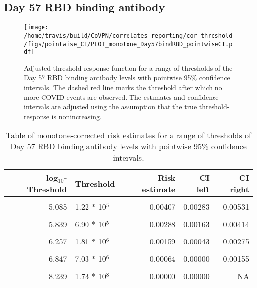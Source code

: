 \documentclass[]{book}
\theoremstyle{definition}
\theoremstyle{definition}
\theoremstyle{definition}
\newcommand{\1}{\mathbbm{1}}
\begin{document}
\newpage

\newpage

\newpage

\hypertarget{day-57-rbd-binding-antibody-1}{%
\subsection{Day 57 RBD binding antibody}\label{day-57-rbd-binding-antibody-1}}

\begin{figure}[H]
\centering
\texttt{[image: /home/travis/build/CoVPN/correlates\_reporting/cor\_threshold/figs/pointwise\_CI/PLOT\_monotone\_Day57bindRBD\_pointwiseCI.pdf]}
\caption{Adjusted threshold-response function for a range of thresholds of the
  Day 57 RBD binding antibody levels with pointwise 95\% confidence intervals. The dashed red line marks the threshold after which no more COVID events are observed. The estimates and confidence intervals are adjusted using the assumption that the true threshold-response is nonincreasing.}
\end{figure}
\begin{table}[!h]

\caption{\label{tab:unnamed-chunk-365}Table of monotone-corrected risk estimates for a range of thresholds of Day 57 RBD binding antibody levels with pointwise 95\% confidence intervals.}
\centering
\begin{tabular}[t]{rlrrr}
\toprule
log$_{10}$-Threshold & Threshold & Risk estimate & CI left & CI right\\
\midrule
\cellcolor{gray!6}{4.062} & \cellcolor{gray!6}{1.15 * 10$^4$} & \cellcolor{gray!6}{0.00490} & \cellcolor{gray!6}{0.00360} & \cellcolor{gray!6}{0.00619}\\
5.085 & 1.22 * 10$^5$ & 0.00407 & 0.00283 & 0.00531\\
\cellcolor{gray!6}{5.507} & \cellcolor{gray!6}{3.21 * 10$^5$} & \cellcolor{gray!6}{0.00377} & \cellcolor{gray!6}{0.00247} & \cellcolor{gray!6}{0.00507}\\
5.839 & 6.90 * 10$^5$ & 0.00288 & 0.00163 & 0.00414\\
\cellcolor{gray!6}{6.048} & \cellcolor{gray!6}{1.12 * 10$^6$} & \cellcolor{gray!6}{0.00238} & \cellcolor{gray!6}{0.00113} & \cellcolor{gray!6}{0.00364}\\
6.257 & 1.81 * 10$^6$ & 0.00159 & 0.00043 & 0.00275\\
\cellcolor{gray!6}{6.499} & \cellcolor{gray!6}{3.16 * 10$^6$} & \cellcolor{gray!6}{0.00124} & \cellcolor{gray!6}{0.00001} & \cellcolor{gray!6}{0.00248}\\
6.847 & 7.03 * 10$^6$ & 0.00064 & 0.00000 & 0.00155\\
\cellcolor{gray!6}{7.181} & \cellcolor{gray!6}{1.52 * 10$^7$} & \cellcolor{gray!6}{0.00064} & \cellcolor{gray!6}{0.00000} & \cellcolor{gray!6}{0.00255}\\
8.239 & 1.73 * 10$^8$ & 0.00000 & 0.00000 & NA\\
\bottomrule
\end{tabular}
\end{table}
\end{document}
